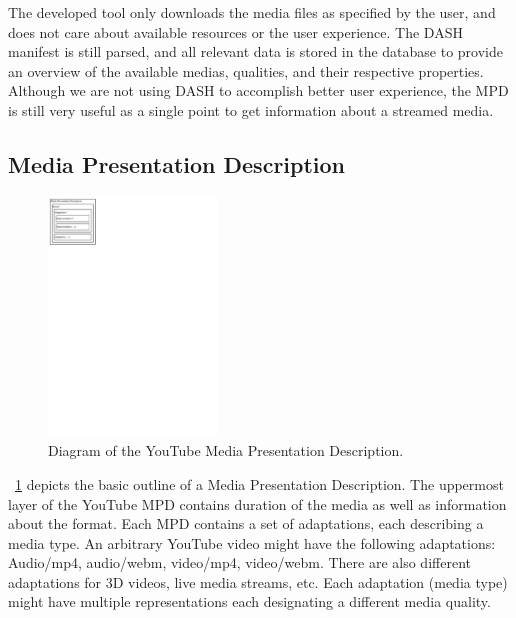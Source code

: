 The developed tool only downloads the media files as specified by the
user, and does not care about available resources or the user experience.
The DASH manifest is still parsed, and all relevant data is stored in the
database to provide an overview of the available medias, qualities,
and their respective properties. Although we are not using DASH to
accomplish better user experience, the MPD is still very useful as a
single point to get information about a streamed media.

\subsection{Media Presentation Description}

\begin{figure}
    \centering
    \includegraphics[width=0.4\textwidth]{figures/dash-mpd-diagram}
    \caption{Diagram of the YouTube Media Presentation Description.}
    \label{fig:dash-mpd-diagram}
\end{figure}

~\cref{fig:dash-mpd-diagram} depicts the basic outline of a Media Presentation
Description. The uppermost layer of the YouTube MPD contains duration of the
media as well as information about the format. Each MPD contains a set of
adaptations, each describing a media type. An arbitrary YouTube video might have
the following adaptations: Audio/mp4, audio/webm, video/mp4, video/webm. There
are also different adaptations for 3D videos, live media streams, etc. Each
adaptation (media type) might have multiple representations each designating a
different media quality.


